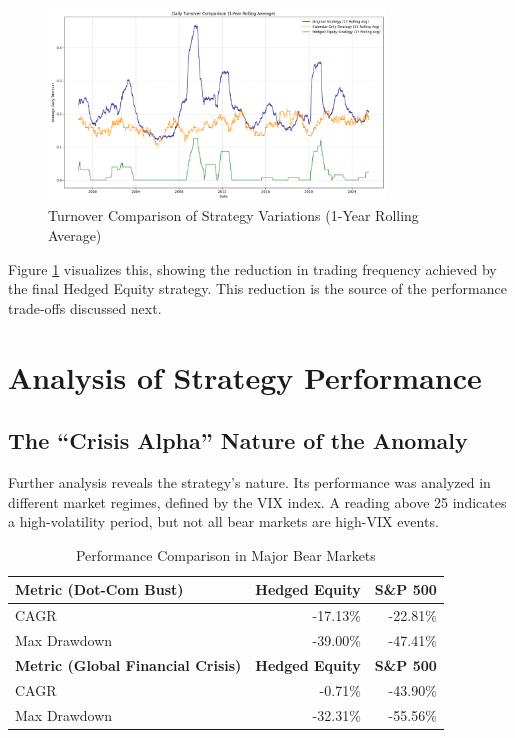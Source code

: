 \documentclass{article}
\begin{document}
\begin{figure}[htbp]
    \centering
    \includegraphics[width=0.8\textwidth]{plots/plot_turnover_analysis.png}
    \caption{Turnover Comparison of Strategy Variations (1-Year Rolling Average)}
    \label{fig:turnover_analysis}
\end{figure}

Figure \ref{fig:turnover_analysis} visualizes this, showing the reduction in trading frequency achieved by the final Hedged Equity strategy. This reduction is the source of the performance trade-offs discussed next.

\vspace{1em}
\hrulefill

\section{Analysis of Strategy Performance}

\subsection{The ``Crisis Alpha'' Nature of the Anomaly}
Further analysis reveals the strategy's nature. Its performance was analyzed in different market regimes, defined by the VIX index. A reading above 25 indicates a high-volatility period, but not all bear markets are high-VIX events.

\begin{table}[htbp]
\centering
\caption{Performance Comparison in Major Bear Markets}
\begin{tabular}{lrr}
\toprule
\textbf{Metric (Dot-Com Bust)} & \textbf{Hedged Equity} & \textbf{S\&P 500} \\
\midrule
CAGR           & -17.13\% & -22.81\% \\
Max Drawdown   & -39.00\% & -47.41\% \\
\midrule
\textbf{Metric (Global Financial Crisis)} & \textbf{Hedged Equity} & \textbf{S\&P 500} \\
\midrule
CAGR           & -0.71\% & -43.90\% \\
Max Drawdown   & -32.31\% & -55.56\% \\
\bottomrule
\end{tabular}
\end{table}
\end{document}
